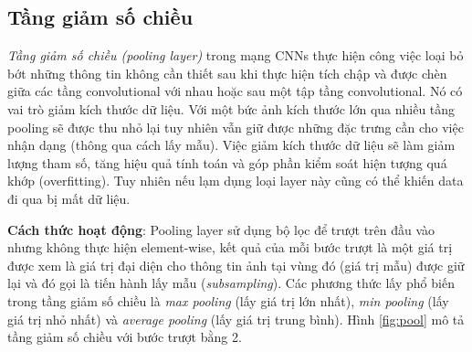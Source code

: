 \subsection{Tầng giảm số chiều}
  \textit{Tầng giảm số chiều (pooling layer)}  \cite{cs231n} trong mạng CNNs thực hiện công việc loại bỏ bớt những thông tin không cần thiết sau khi thực hiện tích chập và được chèn giữa các tầng convolutional với nhau hoặc sau một tập tầng convolutional. Nó có vai trò giảm kích thước dữ liệu. Với một bức ảnh kích thước lớn qua nhiều tầng pooling sẽ được thu nhỏ lại tuy nhiên vẫn giữ được những đặc trưng cần cho việc nhận dạng (thông qua cách lấy mẫu). Việc giảm kích thước dữ liệu sẽ làm giảm lượng tham số, tăng hiệu quả tính toán và góp phần kiểm soát hiện tượng quá khớp (overfitting). Tuy nhiên nếu lạm dụng loại layer này cũng có thể khiến data đi qua bị mất dữ liệu.\par
\textbf{Cách thức hoạt động}: Pooling layer sử dụng bộ lọc để trượt trên đầu vào nhưng không thực hiện element-wise, kết quả của mỗi bước trượt là một giá trị  được xem là giá trị đại diện cho thông tin ảnh tại vùng đó (giá trị mẫu) được giữ lại và đó gọi là tiến hành lấy mẫu (\textit{subsampling}). Các phương thức lấy phổ biến trong tầng giảm số chiều là \textit{max pooling} (lấy giá trị lớn nhất), \textit{min pooling} (lấy giá trị nhỏ nhất) và \textit{average pooling} (lấy giá trị trung bình). Hình \ref{fig:pool} mô tả tầng giảm số chiều với bước trượt bằng 2.

